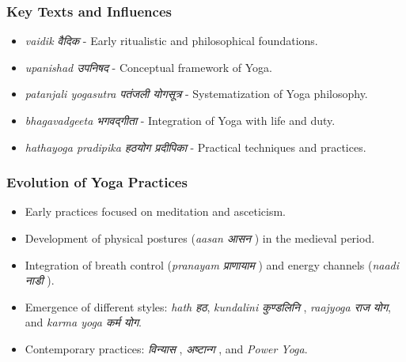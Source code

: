 \begin{frame}[fragile]\frametitle{Key Texts and Influences}

      \begin{itemize}
		\item \textit{vaidik वैदिक} - Early ritualistic and philosophical foundations.
		\item \textit{upanishad उपनिषद } - Conceptual framework of Yoga.
		\item \textit{patanjali yogasutra पतंजली योगसूत्र} - Systematization of Yoga philosophy.
		\item \textit{bhagavadgeeta भगवद्गीता} - Integration of Yoga with life and duty.
		\item \textit{hathayoga pradipika हठयोग प्रदीपिका } - Practical techniques and practices.
	  \end{itemize}

\end{frame}

\begin{frame}[fragile]\frametitle{Evolution of Yoga Practices}

      \begin{itemize}
		\item Early practices focused on meditation and asceticism.
		\item Development of physical postures (\textit{aasan आसन }) in the medieval period.
		\item Integration of breath control (\textit{pranayam प्राणायाम }) and energy channels (\textit{naadi नाडी }).
		\item Emergence of different styles: \textit{hath हठ}, \textit{kundalini कुण्डलिनि }, \textit{raajyoga राज योग}, and \textit{karma yoga कर्म  योग}.
		\item Contemporary practices: \textit{विन्यास }, \textit{अष्टान्ग }, and \textit{Power Yoga}.

	  \end{itemize}

\end{frame}



